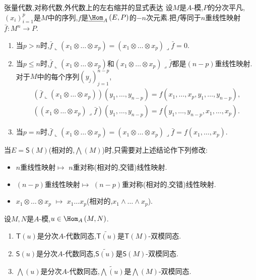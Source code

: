 \begin{example}{张量代数,对称代数,外代数上的左右缩并的显式表达}{}
	设$M$是$A$-模,$P$的分次平凡,$\left(x_{i}\right)_{i=1}^{p}$是$M$中的序列,$f$是$\underline{\Hom}_{A}\left(E,P\right)$的$-n$次元素.把$f$等同于$n$重线性映射$\bar{f}:M^{n}\to P$.
	\begin{enumerate}
		\item 当$p>n$时,$\bar{f}\llcorner\left(x_{1}\otimes\ldots\otimes x_{p}\right)=\left(x_{1}\otimes\ldots\otimes x_{p}\right)\lrcorner\bar{f}=0$.
		\item 当$p\leq n$时,$\bar{f}\llcorner\left(x_{1}\otimes\ldots\otimes x_{p}\right)$和$\left(x_{1}\otimes\ldots\otimes x_{p}\right)\lrcorner\bar{f}$都是$\left(n-p\right)$重线性映射.对于$M$中的每个序列$\left(y_{j}\right)_{j=1}^{n-p}$,
		\begin{gather*}
			\left(\bar{f}\llcorner\left(x_{1}\otimes\ldots\otimes x_{p}\right)\right)\left(y_{1},\ldots,y_{n-p}\right)=f\left(x_{1},\ldots,x_{p},y_{1},\ldots,y_{n-p}\right),\\
			\left(\left(x_{1}\otimes\ldots\otimes x_{p}\right)\lrcorner\bar{f}\right)\left(y_{1},\ldots,y_{n-p}\right)=f\left(y_{1},\ldots,y_{n-p},x_{1},\ldots,x_{p}\right).
		\end{gather*}
		\item 当$p=n$时,$\bar{f}\llcorner\left(x_{1}\otimes\ldots\otimes x_{p}\right)=\left(x_{1}\otimes\ldots\otimes x_{p}\right)\lrcorner\bar{f}=f\left(x_{1},\ldots,x_{p}\right)$.
	\end{enumerate}
	当$E=\mathsf{S}\left(M\right)$(相对的,$\bigwedge\left(M\right)$)时,只需要对上述结论作下列修改:
	\begin{itemize}
		\item $n$重线性映射$\mapsto$ $n$重对称(相对的,交错)线性映射.
		\item $\left(n-p\right)$重线性映射$\mapsto$ $\left(n-p\right)$重对称(相对的,交错)线性映射.
		\item $x_{1}\otimes\ldots\otimes x_{p}$ $\mapsto$ $x_{1}\ldots x_{p}$(相对的,$x_{1}\wedge\ldots\wedge x_{p}$).
	\end{itemize}
\end{example}

\begin{corollary}{}{}
	设$M,N$是$A$-模,$u\in\Hom_{A}\left(M,N\right)$.
	\begin{enumerate}
		\item $\mathsf{T}\left(u\right)$是分次$A$-代数同态,$\widetilde{\mathsf{T}\left(u\right)}$是$\mathsf{T}\left(M\right)$-双模同态.
		\item $\mathsf{S}\left(u\right)$是分次$A$-代数同态,$\widetilde{\mathsf{S}\left(u\right)}$是$\mathsf{S}\left(M\right)$-双模同态.
		\item $\bigwedge\left(u\right)$是分次$A$-代数同态,$\widetilde{\bigwedge\left(u\right)}$是$\bigwedge\left(M\right)$-双模同态.
	\end{enumerate}
\end{corollary}







